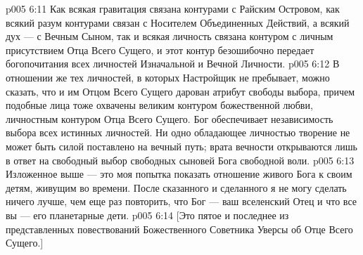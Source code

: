 \vs p005 6:11 \pc Как всякая гравитация связана контурами с Райским Островом, как всякий разум контурами связан с Носителем Объединенных Действий, а всякий дух --- с Вечным Сыном, так и всякая личность связана контуром с личным присутствием Отца Всего Сущего, и этот контур безошибочно передает богопочитания всех личностей Изначальной и Вечной Личности.
\vs p005 6:12 \pc В отношении же тех личностей, в которых Настройщик не пребывает, можно сказать, что и им Отцом Всего Сущего дарован атрибут свободы выбора, причем подобные лица тоже охвачены великим контуром божественной любви, личностным контуром Отца Всего Сущего. Бог обеспечивает независимость выбора всех истинных личностей. Ни одно обладающее личностью творение не может быть силой поставлено на вечный путь; врата вечности открываются лишь в ответ на свободный выбор свободных сыновей Бога свободной воли.
\vs p005 6:13 \pc Изложенное выше --- это моя попытка показать отношение живого Бога к своим детям, живущим во времени. После сказанного и сделанного я не могу сделать ничего лучше, чем еще раз повторить, что Бог --- ваш вселенский Отец и что все вы --- его планетарные дети.
\vsetoff
\vs p005 6:14 [Это пятое и последнее из представленных повествований Божественного Советника Уверсы об Отце Всего Сущего.]
